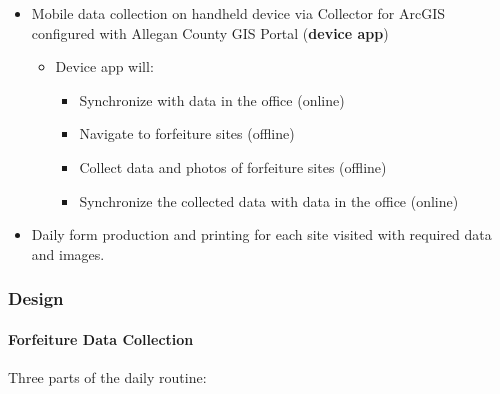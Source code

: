 \documentclass[class=article , crop=false, titlepage, twoside, multi={itemize, figure, verbatim}, float=false]{standalone}
\begin{document}
\begin{itemize} %

\item Mobile data collection on handheld device via Collector for ArcGIS configured with Allegan County GIS Portal  (\textbf{device app})

\begin{itemize} %

\item Device app will:

\begin{itemize} %

\item Synchronize with data in the office (online)
\item Navigate to forfeiture sites (offline)
\item Collect data and photos of forfeiture sites (offline)
\item Synchronize the collected data with data in the office (online)
\end{itemize} %

\end{itemize} %

\item Daily form production and printing for each site visited with required data and images.

\end{itemize} %

\clearpage
\subsubsection{Design}

\paragraph{Forfeiture Data Collection\\}
Three parts of the daily routine:
\end{document}

